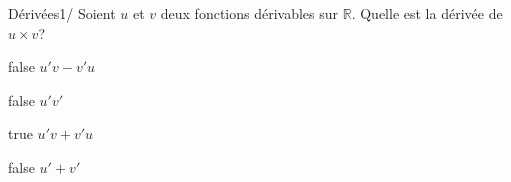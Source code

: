         	\begin{question}{23}{Dérivées}{1}{/}
				Soient $u$ et $v$ deux fonctions dérivables sur $\mathbb{R}$. Quelle est la dérivée de $u\times v$?
            \end{question}
            \begin{reponses}
            	\item[false] $u'v-v'u$
            	\item[false] $u'v'$
                \item[true] $u'v+v'u$
                \item[false] $u'+v'$
            \end{reponses}
